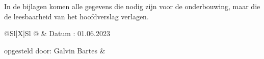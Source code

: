 
In de bijlagen komen alle gegevens die nodig zijn voor de
onderbouwing, maar die de leesbaarheid van het hoofdverslag verlagen.

 



\sffamily
\begin{tabularx}{\textwidth}{@{}Sl|X|Sl @{}}
	\mytoprule
	& Datum : 01.06.2023 \par\mbox{}\par opgesteld door: Galvin Bartes
	&  \\
	\mymidrule
	 \\
	\addlinespace
	 \\
	\midrule
	 \\
\end{tabularx}
